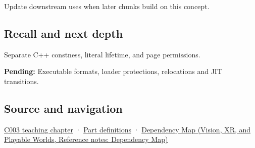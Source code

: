 \hypertarget{appendix-5f9e5e2f0a5e-used-by}{}

Update downstream uses when later chunks build on this concept.

\subsection{Recall and next depth}\label{appendix-5f9e5e2f0a5e-recall-and-next-depth}

\hypertarget{appendix-5f9e5e2f0a5e-recall-and-next-depth}{}

Separate C++ constness, literal lifetime, and page permissions.

\textbf{Pending:} Executable formats, loader protections, relocations and JIT transitions.

\subsection{Source and navigation}\label{appendix-5f9e5e2f0a5e-source-and-navigation}

\hypertarget{appendix-5f9e5e2f0a5e-source-and-navigation}{}

\hyperref[01-foundations-i-ch002-where-the-bytes-live]{C003 teaching chapter} · \hyperref[appendix-fd090d982a15-m003---parts-41-60]{Part definitions} · \href{../07-Vision-XR-and-Playable-Worlds/main.pdf\#nameddest=appendix-4ad47bdd269a}{Dependency Map (Vision, XR, and Playable Worlds, Reference notes: Dependency Map)}
